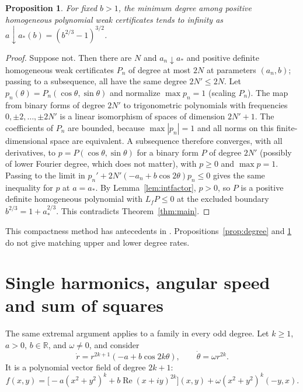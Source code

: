 \documentclass[11pt]{article}
\newtheorem{proposition}[theorem]{Proposition}
\theoremstyle{remark}\newtheorem{remark}[theorem]{Remark}
\newcommand{\R}{\mathbb R}
\newcommand{\Rea}{\operatorname{Re}}
\begin{document}
\begin{proposition}\label{prop:blowup}
For fixed \(b>1\), the minimum degree among positive homogeneous
polynomial weak certificates tends to infinity as
\(a\downarrow a_*(b)=(b^{2/3}-1)^{3/2}\).
\end{proposition}
\begin{proof}
Suppose not. Then there are \(N\) and \(a_n\downarrow a_*\) and positive
definite homogeneous weak certificates \(P_n\) of degree at most
\(2N\) at parameters \((a_n,b)\); passing to a subsequence, all have the
same degree \(2N'\le2N\). Let \(p_n(\theta)=P_n(\cos\theta,\sin\theta)\)
and normalize \(\max p_n=1\) (scaling \(P_n\)). The map from binary forms
of degree \(2N'\) to trigonometric polynomials with frequencies
\(0,\pm2,\dots,\pm2N'\) is a linear isomorphism of spaces of dimension
\(2N'+1\). The coefficients of \(P_n\) are bounded, because
\(\max|p_n|=1\) and all norms on this finite-dimensional space are
equivalent. A subsequence therefore converges, with all derivatives,
to \(p=P(\cos\theta,\sin\theta)\) for a binary form \(P\) of degree
\(2N'\) (possibly of lower Fourier degree, which does not matter),
with \(p\ge0\) and \(\max p=1\). Passing to the limit in
\(p_n'+2N'(-a_n+b\cos2\theta)p_n\le0\) gives the same inequality for
\(p\) at \(a=a_*\). By Lemma~\ref{lem:intfactor}, \(p>0\), so \(P\) is a
positive definite homogeneous polynomial with \(L_fP\le0\) at the
excluded boundary \(b^{2/3}=1+a_*^{2/3}\). This contradicts
Theorem~\ref{thm:main}.
\end{proof}

This compactness method has antecedents in
\cite[Theorem 4.3]{ahmadi-parrilo}.
Propositions~\ref{prop:degree} and \ref{prop:blowup}
do not give matching upper and lower degree rates.

\section{Single harmonics, angular speed and sum of squares}
The same extremal argument applies to a family in every odd degree.
Let \(k\ge1\), \(a>0\), \(b\in\R\), and \(\omega\ne0\), and consider
\begin{equation}\label{eq:higher}
 \dot r=r^{2k+1}(-a+b\cos2k\theta),
 \qquad \dot\theta=\omega r^{2k}.
\end{equation}
It is a polynomial vector field of degree \(2k+1\):
\[
 f(x,y)=
 \bigl[-a(x^2+y^2)^k+b\Rea(x+iy)^{2k}\bigr](x,y)
       +\omega(x^2+y^2)^k(-y,x).
\]
\end{document}
